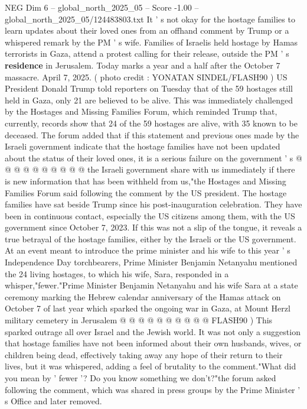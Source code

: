 \begin{textsample}{NEG Dim 6 – global\_north\_2025\_05 – Score -1.00 – global\_north\_2025\_05/124483803.txt}  \label{ex:f6_neg_409}
It ' s not okay for the hostage families to learn updates about their loved ones from an offhand comment by Trump or a whispered remark by the PM ' s wife.
Families of Israelis held hostage by Hamas terrorists in Gaza, attend a protest calling for their release, outside the PM ' s \textbf{residence} in Jerusalem.
Today marks a year and a half after the October 7 massacre.
April 7, 2025. ( photo credit : YONATAN SINDEL/FLASH90 ) US President Donald Trump told reporters on Tuesday that of the 59 hostages still held in Gaza, only 21 are believed to be alive.
This was immediately challenged by the Hostages and Missing Families Forum, which reminded Trump that, currently, records show that 24 of the 59 hostages are alive, with 35 known to be deceased.
The forum added that if this statement and previous ones made by the Israeli government indicate that the hostage families have not been updated about the status of their loved ones, it is a serious failure on the government ' s @ @ @ @ @ @ @ @ @ @ the Israeli government share with us immediately if there is new information that has been withheld from us,"the Hostages and Missing Families Forum said following the comment by the US president.
The hostage families have sat beside Trump since his post-inauguration celebration.
They have been in continuous contact, especially the US citizens among them, with the US government since October 7, 2023.
If this was not a slip of the tongue, it reveals a true betrayal of the hostage families, either by the Israeli or the US government.
At an event meant to introduce the prime minister and his wife to this year ' s Independence Day torchbearers, Prime Minister Benjamin Netanyahu mentioned the 24 living hostages, to which his wife, Sara, responded in a whisper,"fewer."Prime Minister Benjamin Netanyahu and his wife Sara at a state ceremony marking the Hebrew calendar anniversary of the Hamas attack on October 7 of last year which sparked the ongoing war in Gaza, at Mount Herzl military cemetery in Jerusalem @ @ @ @ @ @ @ @ @ @ FLASH90 ) This sparked outrage all over Israel and the Jewish world.
It was not only a suggestion that hostage families have not been informed about their own husbands, wives, or children being dead, effectively taking away any hope of their return to their lives, but it was whispered, adding a feel of brutality to the comment."What did you mean by ' fewer '?
Do you know something we don't?"the forum asked following the comment, which was shared in press groups by the Prime Minister ' s Office and later removed.

\end{textsample}
